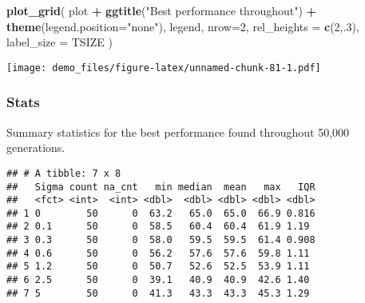 \documentclass[]{book}
\newenvironment{Shaded}{\begin{snugshade}}{\end{snugshade}}
\newcommand{\DataTypeTok}[1]{\textcolor[rgb]{0.13,0.29,0.53}{#1}}
\newcommand{\DecValTok}[1]{\textcolor[rgb]{0.00,0.00,0.81}{#1}}
\newcommand{\KeywordTok}[1]{\textcolor[rgb]{0.13,0.29,0.53}{\textbf{#1}}}
\newcommand{\NormalTok}[1]{#1}
\newcommand{\OperatorTok}[1]{\textcolor[rgb]{0.81,0.36,0.00}{\textbf{#1}}}
\newcommand{\OtherTok}[1]{\textcolor[rgb]{0.56,0.35,0.01}{#1}}
\newcommand{\StringTok}[1]{\textcolor[rgb]{0.31,0.60,0.02}{#1}}
\begin{document}
\begin{Shaded}
\begin{Highlighting}[]
\KeywordTok{plot_grid}\NormalTok{(}
\NormalTok{  plot }\OperatorTok{+}
\StringTok{    }\KeywordTok{ggtitle}\NormalTok{(}\StringTok{"Best performance throughout"}\NormalTok{) }\OperatorTok{+}
\StringTok{    }\KeywordTok{theme}\NormalTok{(}\DataTypeTok{legend.position=}\StringTok{"none"}\NormalTok{),}
\NormalTok{  legend,}
  \DataTypeTok{nrow=}\DecValTok{2}\NormalTok{,}
  \DataTypeTok{rel_heights =} \KeywordTok{c}\NormalTok{(}\DecValTok{2}\NormalTok{,.}\DecValTok{3}\NormalTok{),}
  \DataTypeTok{label_size =}\NormalTok{ TSIZE}
\NormalTok{)}
\end{Highlighting}
\end{Shaded}

\texttt{[image: demo\_files/figure-latex/unnamed-chunk-81-1.pdf]}

\hypertarget{stats-53}{%
\subsubsection{Stats}\label{stats-53}}

Summary statistics for the best performance found throughout 50,000 generations.

\begin{Shaded}
\end{Shaded}

\begin{verbatim}
## # A tibble: 7 x 8
##   Sigma count na_cnt   min median  mean   max   IQR
##   <fct> <int>  <int> <dbl>  <dbl> <dbl> <dbl> <dbl>
## 1 0        50      0  63.2   65.0  65.0  66.9 0.816
## 2 0.1      50      0  58.5   60.4  60.4  61.9 1.19 
## 3 0.3      50      0  58.0   59.5  59.5  61.4 0.908
## 4 0.6      50      0  56.2   57.6  57.6  59.8 1.11 
## 5 1.2      50      0  50.7   52.6  52.5  53.9 1.11 
## 6 2.5      50      0  39.1   40.9  40.9  42.6 1.40 
## 7 5        50      0  41.3   43.3  43.3  45.3 1.29
\end{verbatim}
\end{document}
